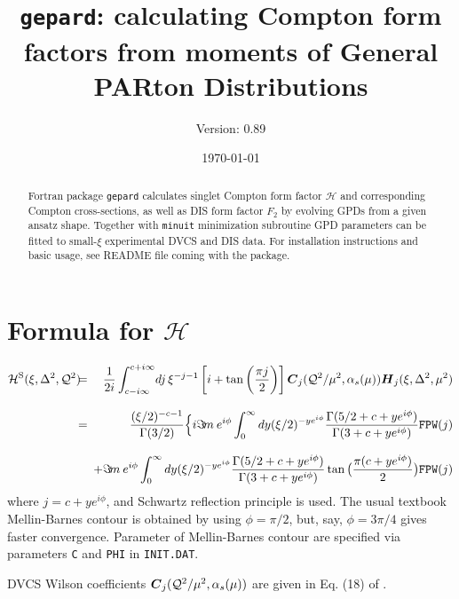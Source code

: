 \documentclass[12pt]{article}
\begin{document}
\title{\texttt{gepard}: calculating Compton form factors from moments of General PARton Distributions } 
\author{Version: 0.89}
\date{\today}
\maketitle

\begin{abstract}
Fortran package \texttt{gepard} calculates singlet Compton form factor
$\mathcal{H}$ and corresponding Compton cross-sections, as well as
DIS form factor $F_2$ by evolving GPDs from a given ansatz shape.  Together
with \texttt{minuit} minimization subroutine GPD parameters can be fitted to
small-$\xi$ experimental DVCS and DIS data. For installation instructions and
basic usage, see README file coming with the package.
\end{abstract}

\section{Formula for $\mathcal{H}$}  

\begin{eqnarray*}
{{\cal H}^{\rm S}}(\xi,\Delta^2,{\cal Q}^2)
&\!\!\!=\!\!\!& \frac{1}{2i}\int_{c-i \infty}^{c+ i \infty}\!
dj\,\xi^{-j-1} \left[i + \tan \left(\frac{\pi j}{2}\right) \right]
\mbox{\boldmath $C$}_{j}({\cal Q}^2/\mu^2,\alpha_s(\mu)) 
\mbox{\boldmath $H$}_{j} (\xi,\Delta^2,\mu^2) \\[2ex]
&\!\!\!=\!\!\!& \frac{(\xi/2)^{-c-1}}{\Gamma(3/2)}\Big\{i \Im\! m\: e^{i\phi} 
\int_{0}^{\infty} dy  (\xi/2)^{- y e^{i\phi}} 
\frac{\Gamma(5/2 + c + y e^{i\phi})}{\Gamma(3 + c + y e^{i\phi})}
\texttt{FPW}(j) \\[2ex]
& & + \Im\! m\:  e^{i\phi} 
\int_{0}^{\infty} dy  (\xi/2)^{- y e^{i\phi}}
\frac{\Gamma(5/2 + c + y e^{i\phi})}{\Gamma(3 + c + y e^{i\phi})}
\tan\big(\frac{\pi(c + y e^{i\phi})}{2}\big)
\texttt{FPW}(j)
\label{<Hformula>}
\end{eqnarray*} 
where $j=c+ye^{i\phi}$, and Schwartz reflection principle is
used.
The usual textbook Mellin-Barnes contour is obtained by
using $\phi = \pi/2$, but, say, $\phi = 3\pi /4$ gives faster
convergence. Parameter of Mellin-Barnes contour are specified
via parameters \texttt{C} and \texttt{PHI} in \texttt{INIT.DAT}.

DVCS Wilson coefficients $\mbox{\boldmath $C$}_{j}({\cal Q}^2/\mu^2,\alpha_s(\mu))$
are given in Eq. (18) of \cite{Kumericki:2006xx}. 
\end{document}
